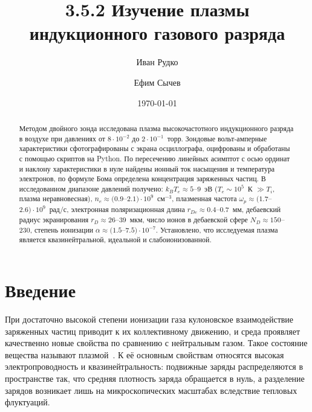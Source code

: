 \documentclass[reprint, amsmath, amssymb, aps, pra, nofootinbib]{revtex4-2}
\begin{document}
\title{3.5.2 Изучение плазмы индукционного газового разряда}

\author{Иван Рудко}

\author{Ефим Сычев}

\date{\today}
\begin{abstract}
Методом двойного зонда исследована плазма высокочастотного индукционного разряда в воздухе при давлениях от $8\cdot10^{-2}$ до $2\cdot10^{-1}$~торр. Зондовые вольт-амперные характеристики сфотографированы с экрана осциллографа, оцифрованы и обработаны с помощью скриптов на Python. По пересечению линейных асимптот с осью ординат и наклону характеристики в нуле найдены ионный ток насыщения и температура электронов, по формуле Бома определена концентрация заряженных частиц. В исследованном диапазоне давлений получено: $k_B T_e \approx 5$--$9$~эВ ($T_e \sim 10^5$~К $\gg T_i$, плазма неравновесная), $n_e \approx (0.9$--$2.1)\cdot10^9$~см$^{-3}$, плазменная частота $\omega_p \approx (1.7$--$2.6)\cdot10^9$~рад/с, электронная поляризационная длина $r_{De} \approx 0.4$--$0.7$~мм, дебаевский радиус экранирования $r_D \approx 26$--$39$~мкм, число ионов в дебаевской сфере $N_D \approx 150$--$230$, степень ионизации $\alpha \approx (1.5$--$7.5)\cdot10^{-7}$. Установлено, что исследуемая плазма является квазинейтральной, идеальной и слабоионизованной.
\end{abstract}

\maketitle

\section{Введение}
При достаточно высокой степени ионизации газа кулоновское взаимодействие заряженных частиц приводит к их коллективному движению, и среда проявляет качественно новые свойства по сравнению с нейтральным газом. Такое состояние вещества называют плазмой~\cite{practicum2019}. К её основным свойствам относятся высокая электропроводность и квазинейтральность: подвижные заряды распределяются в пространстве так, что средняя плотность заряда обращается в нуль, а разделение зарядов возникает лишь на микроскопических масштабах вследствие тепловых флуктуаций.
\end{document}

